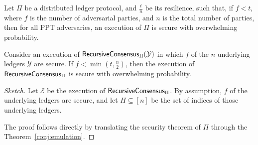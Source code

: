 \begin{theorem}[Security]
  Let $\Pi$ be a distributed ledger protocol, and $\frac{t}{n}$ be its resilience, such
  that, if $f < t$, where $f$ is the number of adversarial parties, and $n$ is the total number of parties,
  then for all PPT adversaries, an execution of $\Pi$ is secure with overwhelming probability.

  Consider an execution of $\textsf{RecursiveConsensus}_{\Pi}(\mathcal{Y})$ in which $f$ of the $n$ underlying
  ledgers $\mathcal{Y}$ are secure. If $f < \min(t, \frac{n}{2})$, then the execution of $\textsf{RecursiveConsensus}_{\Pi}$
  is secure with overwhelming probability.
\end{theorem}
\begin{proof}[Sketch]
  Let $\mathcal{E}$ be the execution of $\textsf{RecursiveConsensus}_{\Pi}$. By assumption, $f$ of
  the underlying ledgers are secure, and let $H \subseteq [n]$ be the set of indices of those underlying ledgers.

  The proof follows directly by translating the security theorem of $\Pi$ through
  the Theorem~\ref{conj:emulation}.
  \Qed
\end{proof}

%
